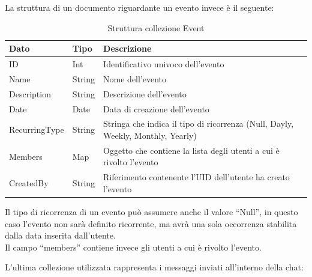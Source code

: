 La struttura di un documento riguardante un evento invece è il seguente:
\begin{table}[!h]
\begin{center}
\begin{tabular}{|l|l|p{8cm}|}
    \hline
\textbf{Dato} & \textbf{Tipo}  & \textbf{Descrizione}\\ \hline
ID & Int & Identificativo univoco dell'evento \\ \hline
Name & String & Nome dell'evento \\ \hline
Description & String & Descrizione dell'evento \\ \hline
Date & Date & Data di creazione dell'evento \\ \hline
RecurringType & String & Stringa che indica il tipo di ricorrenza (Null, Dayly, Weekly, Monthly, Yearly) \\ \hline
Members & Map & Oggetto che contiene la lista degli utenti a cui è rivolto l'evento \\ \hline
CreatedBy & String &  Riferimento contenente l'UID dell'utente ha creato l'evento \\ \hline
\end{tabular}
\caption[Collezione Event]{Struttura collezione Event}\label{tab:Strutture collezione Event}
\end{center}
\end{table}

Il tipo di ricorrenza di un evento può assumere anche il valore ``Null'', in questo caso l'evento non sarà definito ricorrente, ma avrà una sola occorrenza stabilita dalla data inserita dall'utente.\\
Il campo ``members'' contiene invece gli utenti a cui è rivolto l'evento.


\newpage

L'ultima collezione utilizzata rappresenta i messaggi inviati all'interno della chat:


